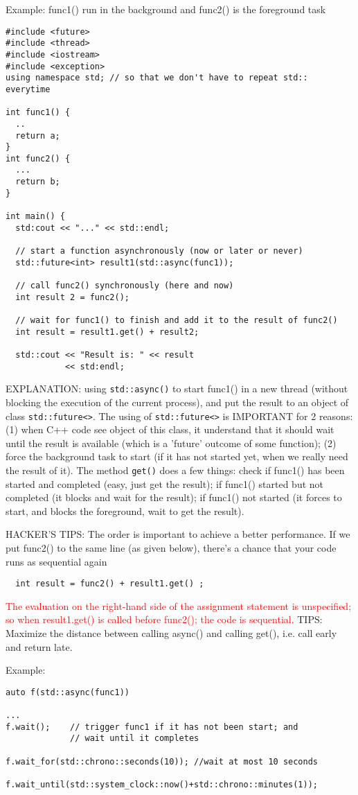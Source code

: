 Example: func1() run in the background and func2() is the foreground task
\begin{lstlisting}
#include <future>
#include <thread>
#include <iostream>
#include <exception>
using namespace std; // so that we don't have to repeat std:: everytime

int func1() {
  ..
  return a;
}
int func2() {
  ...
  return b;
}

int main() {
  std:cout << "..." << std::endl;
  
  // start a function asynchronously (now or later or never)
  std::future<int> result1(std::async(func1));
  
  // call func2() synchronously (here and now)
  int result 2 = func2(); 

  // wait for func1() to finish and add it to the result of func2()
  int result = result1.get() + result2;
    
  std::cout << "Result is: " << result
            << std:endl;
\end{lstlisting}
EXPLANATION: using \verb!std::async()! to start func1() in a new thread
(without blocking the execution of the current process), and put the result to
an object of class \verb!std::future<>!. The using of \verb!std::future<>! is
IMPORTANT for 2 reasons: (1) when C++ code see object of this class, it
understand that it should wait until the result is available (which is a
'future' outcome of some function); (2) force the background task to start (if
it has not started yet, when we really need the result of it). The method
\verb!get()! does a few things: check if func1() has been started and completed
(easy, just get the result); if func1() started but not completed (it blocks
and wait for the result); if func1() not started (it forces to start, and
blocks the foreground, wait to get the result).

HACKER'S TIPS: The order is important to achieve a better performance. If we put
func2() to the same line (as given below), there's a chance that your code
runs as sequential again
\begin{verbatim}
  int result = func2() + result1.get() ;
\end{verbatim} 
\textcolor{red}{The evaluation on the right-hand side of the assignment
statement is unspecified; so when result1.get() is called before  func2(); the
code is sequential.} TIPS: Maximize the distance between calling async() and
calling get(), i.e. call early and return late.

Example:
\begin{lstlisting}
auto f(std::async(func1))

...
f.wait();    // trigger func1 if it has not been start; and 
             // wait until it completes
             
f.wait_for(std::chrono::seconds(10)); //wait at most 10 seconds

f.wait_until(std::system_clock::now()+std::chrono::minutes(1));
\end{lstlisting}

